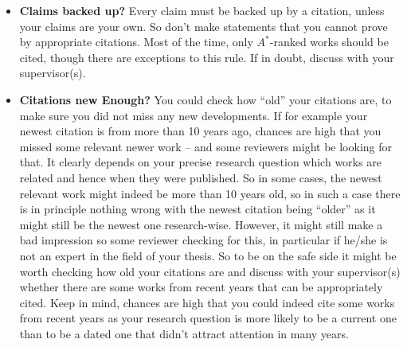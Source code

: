 \begin{itemize}
  \item \textbf{Claims backed up?} Every claim must be backed up by a citation, unless your claims are your own. So don't make statements that you cannot prove by appropriate citations. Most of the time, only $A^*$-ranked works should be cited, though there are exceptions to this rule. If in doubt, discuss with your supervisor(s). 
  
  \item \textbf{Citations new Enough?} You could check how ``old'' your citations are, to make sure you did not miss any new developments. If for example your newest citation is from more than 10 years ago, chances are high that you missed some relevant newer work -- and some reviewers might be looking for that. It clearly depends on your precise research question which works are related and hence when they were published. So in some cases, the newest relevant work might indeed be more than 10 years old, so in such a case there is in principle nothing wrong with the newest citation being ``older'' as it might still be the newest one research-wise. However, it might still make a bad impression so some reviewer checking for this, in particular if he/she is not an expert in the field of your thesis. So to be on the safe side it might be worth checking how old your citations are and discuss with your supervisor(s) whether there are some works from recent years that can be appropriately cited. Keep in mind, chances are high that you could indeed cite some works from recent years as your research question is more likely to be a current one than to be a dated one that didn't attract attention in many years.
  

\end{itemize}
